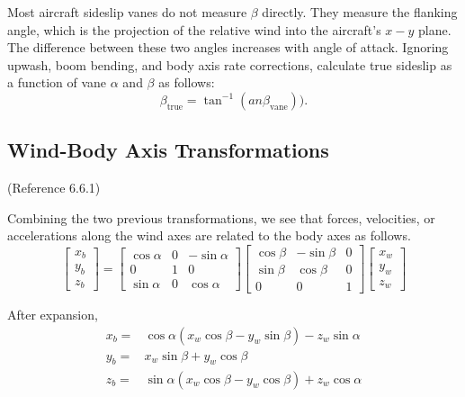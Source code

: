 \documentclass[
]{book}
\begin{document}
Most aircraft sideslip vanes do not measure \(\beta\) directly. They measure the flanking angle, which is the projection of the relative wind into the aircraft's \(x-y\) plane. The difference between these two angles increases with angle of attack. Ignoring upwash, boom bending, and body axis rate corrections, calculate true sideslip as a function of vane \(\alpha\) and \(\beta\) as follows:
\[\beta_{\mathrm{true}} = \tan^{-1} (an\beta_{\mathrm{vane}})).\]

\hypertarget{wind-body-axis-transformations}{%
\subsection{Wind-Body Axis Transformations}\label{wind-body-axis-transformations}}

(Reference 6.6.1)

Combining the two previous transformations, we see that forces, velocities, or accelerations along the wind axes are related to the body axes as follows.
\[
\begin{bmatrix}
x_b \\
y_b \\
z_b
\end{bmatrix} = 
\begin{bmatrix}
\cos \alpha & 0 & -\sin \alpha \\
0 & 1 & 0 \\
\sin \alpha & 0 & \cos \alpha
\end{bmatrix}
\begin{bmatrix}
\cos \beta & -\sin \beta & 0 \\
\sin \beta & \cos \beta & 0 \\
0 & 0 & 1
\end{bmatrix}
\begin{bmatrix}
x_w \\
y_w \\
z_w 
\end{bmatrix}
\]

After expansion,
\[
\begin{align}
x_b =& \cos \alpha (x_w \cos \beta - y_w \sin \beta) - z_w \sin \alpha \\
y_b =& x_w \sin \beta + y_w \cos \beta \\
z_b =& \sin \alpha (x_w \cos \beta - y_w \cos \beta) + z_w \cos \alpha 
\end{align}
\]
\end{document}
